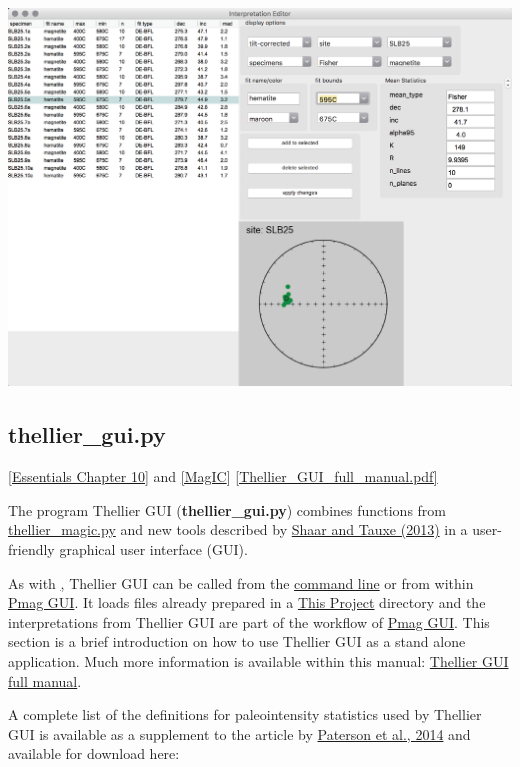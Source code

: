 \documentclass[11pt]{book}
\begin{document}
\includegraphics[width=15 cm]{EPSfiles/demag_gui_InterpEditor.eps}


\subsection{thellier\_gui.py}
\href{http://earthref.org/MAGIC/books/Tauxe/Essentials/WebBook3ch10.html#ch10}{[Essentials Chapter 10]} and \href{#MagIC}{[MagIC}]
\href{https://github.com/PmagPy/Pmag-Cookbook/raw/gh-pages//thellier_GUI_full_manual.pdf}{[Thellier\_GUI\_full_manual.pdf]}

The program Thellier GUI ({\bf thellier\_gui.py})  combines functions from \href{#thellier_magic.py}{thellier\_magic.py} and new tools described by  \href{http://dx.doi.org/10.1002/ggge.20062}{Shaar and Tauxe (2013)} \nocite{shaar13} in a user-friendly graphical user interface (GUI).

As with \href{#demag_gui.py}, Thellier GUI can  be called from  the  \href{#command_line}{command line} or from within \href{#pmag_gui.py}{Pmag GUI}.  It loads  files already prepared in a  \href{#ThisProject}{This Project} directory and the interpretations from Thellier GUI are part of the workflow of  \href{#pmag_gui.py}{Pmag GUI}.   This section is a brief introduction on how to use Thellier GUI as a stand alone application. Much more information is available within this manual: \href{https://github.com/PmagPy/Pmag-Cookbook/raw/gh-pages//thellier_GUI_full_manual.pdf}{Thellier GUI full manual}.

\noindent  A complete list of the definitions for paleointensity statistics used by Thellier GUI is available as a supplement to the article by \href{#http://dx.doi.org/10.1002/2013GC005135}{Paterson et al., 2014}  \nocite{paterson14} and available for download here:
\end{document}
